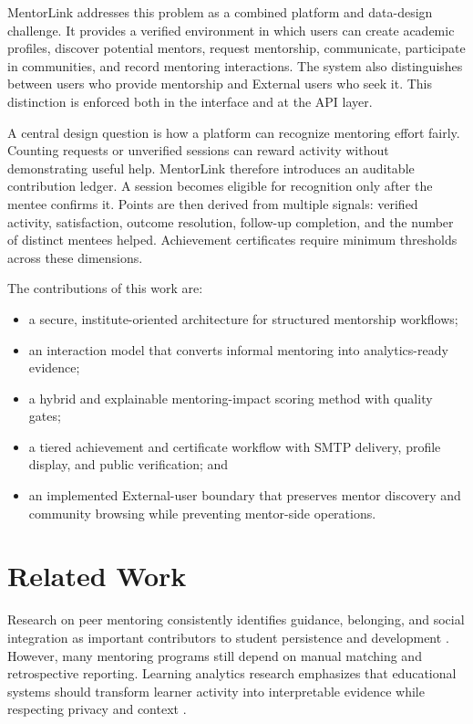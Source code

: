 \documentclass[conference]{IEEEtran}
\begin{document}
MentorLink addresses this problem as a combined platform and data-design challenge. It provides a verified environment in which users can create academic profiles, discover potential mentors, request mentorship, communicate, participate in communities, and record mentoring interactions. The system also distinguishes between users who provide mentorship and External users who seek it. This distinction is enforced both in the interface and at the API layer.

A central design question is how a platform can recognize mentoring effort fairly. Counting requests or unverified sessions can reward activity without demonstrating useful help. MentorLink therefore introduces an auditable contribution ledger. A session becomes eligible for recognition only after the mentee confirms it. Points are then derived from multiple signals: verified activity, satisfaction, outcome resolution, follow-up completion, and the number of distinct mentees helped. Achievement certificates require minimum thresholds across these dimensions.

The contributions of this work are:
\begin{itemize}
    \item a secure, institute-oriented architecture for structured mentorship workflows;
    \item an interaction model that converts informal mentoring into analytics-ready evidence;
    \item a hybrid and explainable mentoring-impact scoring method with quality gates;
    \item a tiered achievement and certificate workflow with SMTP delivery, profile display, and public verification; and
    \item an implemented External-user boundary that preserves mentor discovery and community browsing while preventing mentor-side operations.
\end{itemize}

\section{Related Work}
Research on peer mentoring consistently identifies guidance, belonging, and social integration as important contributors to student persistence and development \cite{tinto1993,gershenfeld2014}. However, many mentoring programs still depend on manual matching and retrospective reporting. Learning analytics research emphasizes that educational systems should transform learner activity into interpretable evidence while respecting privacy and context \cite{siemens2013,ferguson2012,knox2013,drachsler2015}.
\end{document}
